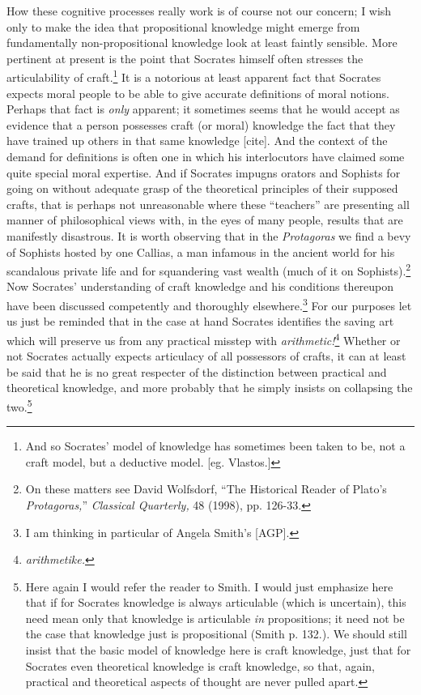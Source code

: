 \documentclass[11pt]{amsart}
\begin{document}
How these cognitive processes really work is of course not our
concern; I wish only to make the idea that propositional knowledge
might emerge from fundamentally non-propositional knowledge look at
least faintly sensible. More pertinent at present is the point that
Socrates himself often stresses the articulability of
craft.\footnote{And so Socrates' model of knowledge has sometimes been
taken to be, not a craft model, but a deductive model. [eg. Vlastos.]}
It is a notorious at least apparent fact that Socrates expects moral
people to be able to give accurate definitions of moral notions.
Perhaps that fact is \emph{only} apparent; it sometimes seems that he
would accept as evidence that a person possesses craft  (or moral)
knowledge the fact that they have trained up others in that same
knowledge [cite]. And the context of the demand for definitions is
often one in which his interlocutors have claimed some quite special
moral expertise. And if Socrates impugns orators and Sophists for
going on without adequate grasp of the theoretical principles of their
supposed crafts, that is perhaps not unreasonable where these
``teachers'' are presenting all manner of philosophical views with, in
the eyes of many people, results that are manifestly disastrous. It is
worth observing that in the \emph{Protagoras} we find a bevy of
Sophists hosted by one Callias, a man infamous in the ancient world
for his scandalous private life and for squandering vast wealth (much
of it on Sophists).\footnote{On these matters see David Wolfsdorf,
``The Historical Reader of Plato's \emph{Protagoras,}''
\emph{Classical Quarterly,} 48 (1998), pp. 126-33.} Now Socrates'
understanding of craft knowledge and his conditions thereupon have
been discussed competently and thoroughly elsewhere.\footnote{I am
thinking in particular of Angela Smith's [AGP].} For our purposes let
us just be reminded that in the case at hand Socrates identifies the
saving art which will preserve us from any practical misstep with
\emph{arithmetic!}\footnote{\emph{arithmetike.}} Whether or not
Socrates actually expects articulacy of all possessors of crafts, it
can at least be said that he is no great respecter of the distinction
between practical and theoretical knowledge, and more probably that he
simply insists on collapsing the two.\footnote{Here again I would
refer the reader to Smith. I would just emphasize here that if for
Socrates knowledge is always articulable (which is uncertain), this
need mean only that knowledge is articulable \emph{in} propositions;
it need not be the case that knowledge just is propositional (Smith p.
132.). We should still insist that the basic model of knowledge here
is craft knowledge, just that for Socrates even theoretical knowledge
is craft knowledge, so that, again, practical and theoretical aspects
of thought are never pulled apart.}
\end{document}
